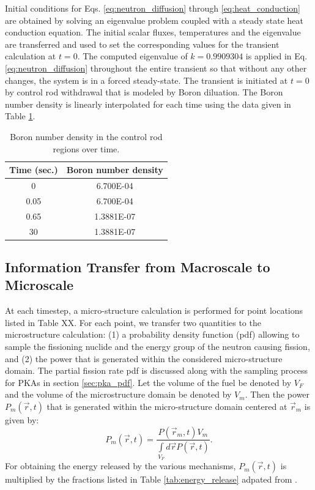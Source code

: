 \documentclass{anstrans}
\begin{document}
Initial conditions for Eqs. \ref{eq:neutron_diffusion} through \ref{eq:heat_conduction} are obtained by solving an eigenvalue problem coupled with a steady state heat conduction equation. The initial scalar fluxes, temperatures and the eigenvalue are transferred and used to set the corresponding values for the transient calculation at $t=0$. 
The computed eigenvalue of $k=0.9909304$ is applied in Eq. \ref{eq:neutron_diffusion} throughout the entire transient so that without any other changes, the system is in a forced steady-state. The transient is initiated at $t=0$ by control rod withdrawal that is modeled by Boron diluation. The Boron number density is linearly interpolated for each time using the data given in Table \ref{tab:boron_linear}.  

\begin{table}[t]
\centering
\caption{Boron number density in the control rod regions over time. \label{tab:boron_linear}}
\begin{tabular}{cc}
\toprule
Time (sec.) & Boron number density \\
\midrule
 0     & 6.700E-04\\
0.05 & 6.700E-04\\
0.65 & 1.3881E-07\\
30    & 1.3881E-07\\
\bottomrule
\end{tabular}
\end{table}

\subsection{Information Transfer from Macroscale to Microscale}
At each timestep, a micro-structure calculation is performed for point locations listed in Table XX. For each point, we transfer two quantities to the
microstructure calculation: (1) a probability density function (pdf) allowing to sample the fissioning nuclide and the energy group of the neutron causing fission, and (2) the power that is generated within the considered micro-structure domain. The partial fission rate pdf is discussed along with the sampling process for PKAs in section \ref{sec:pka_pdf}. Let the volume of the fuel be denoted by $V_F$ and the volume of the microstructure domain be denoted by $V_m$. Then the power $P_m(\vec{r}, t)$ that is generated within the micro-structure domain centered at $\vec{r}_m$ is given by:
\begin{equation}
     P_m(\vec{r}, t) = \frac{P(\vec{r}_m,t) V_m}{\int\limits_{V_F}d\vec{r} P(\vec{r},t)}.
\end{equation}
For obtaining the energy released by the various mechanisms, $P_m(\vec{r}, t)$ is multiplied by the fractions listed in Table \ref{tab:energy_release} adpated from \cite{DH}.
\end{document}
